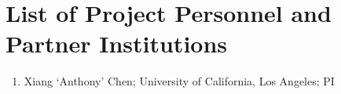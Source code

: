 \section*{List of Project Personnel and Partner Institutions}

\begin{enumerate}
 \item Xiang `Anthony' Chen; University of California, Los Angeles; PI
\end{enumerate}